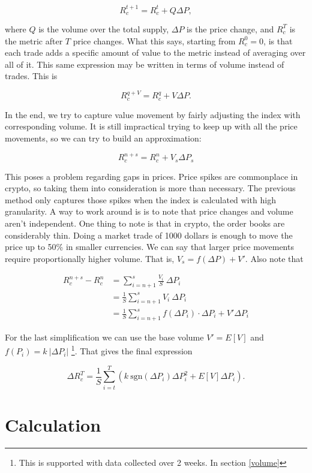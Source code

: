 \documentclass[11pt,a4paper]{article}
\begin{document}
$$
R_c^{t+1} = R_c^{t} + Q \Delta P,
$$

where $Q$ is the volume over the total supply, $\Delta P$ is the price change, and $R_c^{T}$ is the metric after $T$ price changes. What this says, starting from $R_c^{0} = 0$, is that each trade adds a specific amount of value to the metric instead of averaging over all of it. This same expression may be written in terms of volume instead of trades. This is

$$
R_c^{q+V} = R_c^{q} + V \Delta P.
$$

In the end, we try to capture value movement by fairly adjusting the index with corresponding volume. It is still impractical trying to keep up with all the price movements, so we can try to build an approximation:

$$
R_c^{n+s} = R_c^{n} + V_{s} \Delta P_{s}
$$

This poses a problem regarding gaps in prices. Price spikes are commonplace in crypto, so taking them into consideration is more than necessary. The previous method only captures those spikes when the index is calculated with high granularity. A way to work around is is to note that price changes and volume aren't independent. One thing to note is that in crypto, the order books are considerably thin. Doing a market trade of 1000 dollars is enough to move the price up to 50\% in smaller currencies. We can say that larger price movements require proportionally higher volume. That is, $V_{s} = f(\Delta P) + V'$. Also note that

\begin{equation}
\begin{split}
R_c^{n+s} - R_c^{n} &= \sum_{i=n+1}^{s} \frac{V_i}{S}\ \Delta P_i \\
  &= \frac{1}{S} \sum_{i=n+1}^{s} V_i\ \Delta P_i \\
  &= \frac{1}{S} \sum_{i=n+1}^{s} f( \Delta P_i )  \cdot \Delta P_i + V' \Delta P_i
\end{split}
\end{equation}

For the last simplification we can use the base volume $V' = E[V]$ and $f(P_i) = k\ | \Delta P_i |$ \footnote{This is supported with data collected over 2 weeks. In section \ref{volume}}. That gives the final expression

$$
\Delta R_c^T = \frac{1}{S} \sum_{i=t}^{T} \left( k\ \text{sgn} (\Delta P_i) \Delta P_i^2  + E \left[ V \right] \Delta P_i \right).
$$

\section{Calculation}
\end{document}
